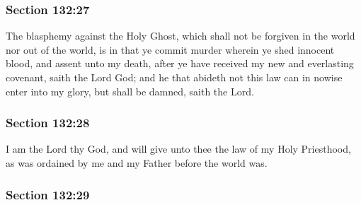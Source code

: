 
	\subsubsection{Section 132:27} %
		\label{DC132-27}

		The blasphemy against the Holy Ghost, which shall not be forgiven in the world nor out of the world, is in that ye commit murder wherein ye shed innocent blood, and assent unto my death, after ye have received my new and everlasting covenant, saith the Lord God; and he that abideth not this law can in nowise enter into my glory, but shall be damned, saith the Lord.


	\subsubsection{Section 132:28} %
		\label{DC132-28}

		I am the Lord thy God, and will give unto thee the law of my Holy Priesthood, as was ordained by me and my Father before the world was.


	\subsubsection{Section 132:29} %
		\label{DC132-29}

